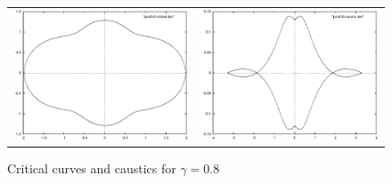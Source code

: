 \documentclass[aspectratio=1610,xcolor=dvipsnames,t]{beamer}
\begin{document}
    \begin{figure}
        \caption{Critical curves and caustics for $\gamma = 0.8$}
        \label{fig:critical-gamma08}
        \begin{center}
            \begin{tabular}{cc}
                \includegraphics[width=\columnwidth]{images/pos0-8-critical.eps} &
                \includegraphics[width=\columnwidth]{images/pos0-8-caustic.eps} 
            \end{tabular} 
        \end{center}
    \end{figure}
\end{document}
